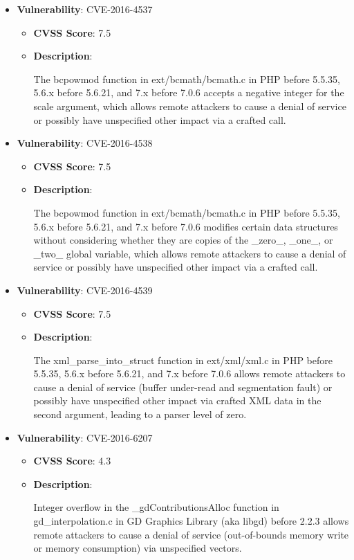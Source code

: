 \documentclass{article}
\begin{document}
\begin{itemize}
        \item \textbf{Vulnerability}: CVE-2016-4537
        \begin{itemize}
            \item \textbf{CVSS Score}:  7.5 
            \item \textbf{Description}:
            \parbox[t]{0.9\linewidth}{
                \ttfamily The bcpowmod function in ext/bcmath/bcmath.c in PHP before 5.5.35, 5.6.x before 5.6.21, and 7.x before 7.0.6 accepts a negative integer for the scale argument, which allows remote attackers to cause a denial of service or possibly have unspecified other impact via a crafted call.
            }
        \end{itemize}
    
        \item \textbf{Vulnerability}: CVE-2016-4538
        \begin{itemize}
            \item \textbf{CVSS Score}:  7.5 
            \item \textbf{Description}:
            \parbox[t]{0.9\linewidth}{
                \ttfamily The bcpowmod function in ext/bcmath/bcmath.c in PHP before 5.5.35, 5.6.x before 5.6.21, and 7.x before 7.0.6 modifies certain data structures without considering whether they are copies of the \_zero\_, \_one\_, or \_two\_ global variable, which allows remote attackers to cause a denial of service or possibly have unspecified other impact via a crafted call.
            }
        \end{itemize}
    
        \item \textbf{Vulnerability}: CVE-2016-4539
        \begin{itemize}
            \item \textbf{CVSS Score}:  7.5 
            \item \textbf{Description}:
            \parbox[t]{0.9\linewidth}{
                \ttfamily The xml\_parse\_into\_struct function in ext/xml/xml.c in PHP before 5.5.35, 5.6.x before 5.6.21, and 7.x before 7.0.6 allows remote attackers to cause a denial of service (buffer under-read and segmentation fault) or possibly have unspecified other impact via crafted XML data in the second argument, leading to a parser level of zero.
            }
        \end{itemize}
    
        \item \textbf{Vulnerability}: CVE-2016-6207
        \begin{itemize}
            \item \textbf{CVSS Score}:  4.3 
            \item \textbf{Description}:
            \parbox[t]{0.9\linewidth}{
                \ttfamily Integer overflow in the \_gdContributionsAlloc function in gd\_interpolation.c in GD Graphics Library (aka libgd) before 2.2.3 allows remote attackers to cause a denial of service (out-of-bounds memory write or memory consumption) via unspecified vectors.
            }
        \end{itemize}
    

\end{itemize}
\end{document}
